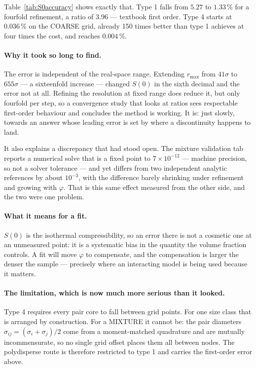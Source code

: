 \documentclass[11pt,a4paper]{article}
\begin{document}
Table~\ref{tab:S0accuracy} shows exactly that. Type 1 falls from $5.27$ to
$1.33\,\%$ for a fourfold refinement, a ratio of $3.96$ --- textbook first
order. Type 4 starts at $0.036\,\%$ on the COARSE grid, already 150 times
better than type 1 achieves at four times the cost, and reaches $0.004\,\%$.

\paragraph{Why it took so long to find.} The error is independent of the
real-space range. Extending $r_{\max}$ from $41\sigma$ to $655\sigma$ --- a
sixteenfold increase --- changed $S(0)$ in the sixth decimal and the error not
at all. Refining the resolution at fixed range does reduce it, but only
fourfold per step, so a convergence study that looks at ratios sees
respectable first-order behaviour and concludes the method is working. It is:
just slowly, towards an answer whose leading error is set by where a
discontinuity happens to land.

It also explains a discrepancy that had stood open. The mixture validation
tab reports a numerical solve that is a fixed point to $7\times10^{-12}$ ---
machine precision, so not a solver tolerance --- and yet differs from two
independent analytic references by about $10^{-3}$, with the difference
barely shrinking under refinement and growing with $\varphi$. That is this
same effect measured from the other side, and the two were one problem.

\paragraph{What it means for a fit.} $S(0)$ is the isothermal
compressibility, so an error there is not a cosmetic one at an unmeasured
point: it is a systematic bias in the quantity the volume fraction controls.
A fit will move $\varphi$ to compensate, and the compensation is larger the
denser the sample --- precisely where an interacting model is being used
because it matters.

\paragraph{The limitation, which is now much more serious than it looked.}
Type 4 requires every pair core to fall between grid points. For one size
class that is arranged by construction. For a MIXTURE it cannot be: the pair
diameters $\sigma_{ij} = (\sigma_i+\sigma_j)/2$ come from a moment-matched
quadrature and are mutually incommensurate, so no single grid offset places
them all between nodes. The polydisperse route is therefore restricted to
type 1 and carries the first-order error above.
\end{document}

